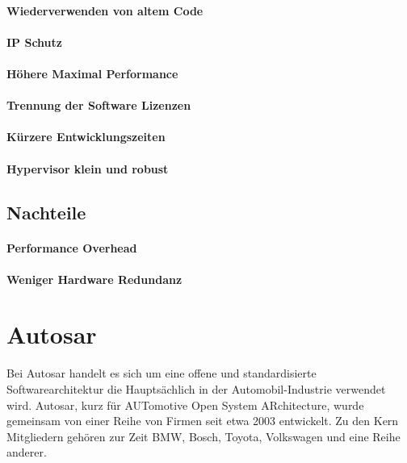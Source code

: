 \documentclass[
  a4paper,					    %
  twoside,
  DIV=calc,     				%
  bibliography=totoc,
  cleardoublepage=empty,
  ngerman,     					%
  final       					%
]{scrbook}
\begin{document}
\paragraph{Wiederverwenden von altem Code}

\paragraph{IP Schutz}

\paragraph{Höhere Maximal Performance}

\paragraph{Trennung der Software Lizenzen}

\paragraph{Kürzere Entwicklungszeiten}

\paragraph{Hypervisor klein und robust}


\subsection{Nachteile}

\paragraph{Performance Overhead}

\paragraph{Weniger Hardware Redundanz}







\section{Autosar}
\label{sec:Autosar}
Bei Autosar handelt es sich um eine offene und standardisierte Softwarearchitektur die Hauptsächlich in der Automobil-Industrie verwendet wird. Autosar, kurz für AUTomotive Open System ARchitecture, wurde gemeinsam von einer Reihe von Firmen seit etwa 2003 entwickelt. Zu den Kern Mitgliedern gehören zur Zeit BMW, Bosch, Toyota, Volkswagen und eine Reihe anderer.
\end{document}
